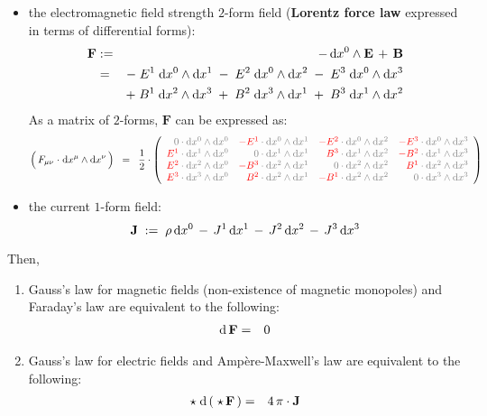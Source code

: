\begin{theorem}
\begin{itemize}
\item
	the electromagnetic field strength $2$-form field (\textbf{Lorentz force law} expressed in terms of differential forms):
	\begin{eqnarray*}
	\mathbf{F}
	& := &
		- \, \textnormal{d} x^{0} \wedge \mathbf{E} \, + \, \mathbf{B}
	\\
	& = &
		- \; E^{1}\;\textnormal{d} x^{0} \wedge \textnormal{d} x^{1} \; - \; E^{2}\;\textnormal{d} x^{0} \wedge \textnormal{d} x^{2} \; - \; E^{3}\;\textnormal{d} x^{0} \wedge \textnormal{d} x^{3}
	\\
	&&
		+\;
		B^{1}\;\textnormal{d} x^{2} \wedge \textnormal{d} x^{3}
		\;+\;
		B^{2}\;\textnormal{d} x^{3} \wedge \textnormal{d} x^{1}
		\;+\;
		B^{3}\;\textnormal{d} x^{1} \wedge \textnormal{d} x^{2}
	\end{eqnarray*}
	As a matrix of $2$-forms, $\mathbf{F}$ can be expressed as:
	\begin{equation*}
	\left(\,F_{\mu\nu}\overset{{\color{white}1}}{\cdot}\d x^{\mu} \wedge \d x^{\nu}\,\right)
	\;\; = \;\;
	\dfrac{1}{2}\cdot
	\left({\color{gray}\begin{array}{rrrr}
	0\cdot\d x^{0}\wedge\d x^{0} &
	{\color{red}-E^{1}} \cdot\d x^{0}\wedge\d x^{1} &
	{\color{red}-E^{2}} \cdot\d x^{0}\wedge\d x^{2} &
	{\color{red}-E^{3}} \cdot\d x^{0}\wedge\d x^{3}
	\\
	{\color{red}E^{1}} \cdot\d x^{1}\wedge\d x^{0} &
	0 \cdot\d x^{1}\wedge\d x^{1} &
	{\color{red}B^{3}} \cdot\d x^{1}\wedge\d x^{2} &
	{\color{red}-B^{2}} \cdot\d x^{1}\wedge\d x^{3}
	\\
	{\color{red}E^{2}} \cdot\d x^{2}\wedge\d x^{0} &
	{\color{red}-B^{3}} \cdot\d x^{2}\wedge\d x^{1} &
	0 \cdot\d x^{2}\wedge\d x^{2} &
	{\color{red}B^{1}} \cdot\d x^{2}\wedge\d x^{3}
	\\
	{\color{red}E^{3}} \cdot\d x^{3}\wedge\d x^{0} &
	{\color{red}B^{2}} \cdot\d x^{2}\wedge\d x^{1} &
	{\color{red}-B^{1}} \cdot\d x^{2}\wedge\d x^{2} &
	0 \cdot\d x^{3}\wedge\d x^{3}
	\end{array}}\right)
	\end{equation*}
\item
	the current $1$-form field:
	\begin{equation*}
	\mathbf{J} \; := \; \rho \, \textnormal{d} x^{0} \,-\, J^{1}\,\textnormal{d} x^{1} \,-\, J^{2}\,\textnormal{d} x^{2} \,-\, J^{3}\,\textnormal{d} x^{3}
	\end{equation*}
\end{itemize}
Then,
\begin{enumerate}
\item
	Gauss's law for magnetic fields (non-existence of magnetic monopoles) and Faraday's law are equivalent to the following:
	\begin{eqnarray*}
	\textnormal{d}\,\mathbf{F} & = & 0
	\end{eqnarray*}
\item
	Gauss's law for electric fields and Amp\`{e}re-Maxwell's law are equivalent to the following:
	\begin{eqnarray*}
	\star\;\textnormal{d} \left(\;\star\,\mathbf{F}\,\right) & = & 4\,\pi\cdot\mathbf{J}
	\end{eqnarray*}	
\end{enumerate}
\end{theorem}
